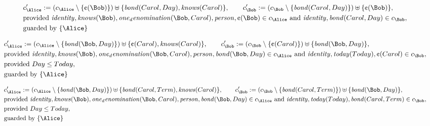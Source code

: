 \begin{align*}
&
c'_
{
\Alice
}
 := 
(c_
{
\Alice
}
 \setminus 
\{
\text{\textcent}
(
\Bob
)
\}
) \uplus 
\{
\mathit{
bond
}
(
Carol
,
Day
)
,
\mathit{
knows
}
(
Carol
)
\}
, \qquad 
c'_
{
\Bob
}
 := 
(c_
{
\Bob
}
 \setminus 
\{
\mathit{
bond
}
(
Carol
,
Day
)
\}
) \uplus 
\{
\text{\textcent}
(
\Bob
)
\}
,\\
&
\text{provided } 
\mathit{
identity
}
,
\mathit{
knows
}
(
\Bob
)
,
\mathit{
one_denomination
}
(
\Bob
,
Carol
)
,
\mathit{
person
}
,
\text{\textcent}
(
\Bob
)
 \in c_
{
\Alice
}
 \text{ and } 
\mathit{
identity
}
,
\mathit{
bond
}
(
Carol
,
Day
)
 \in c_
{
\Bob
}
,\\
&
\text{guarded by } \{
\Alice
\}
\end{align*}

\begin{align*}
&
c'_
{
\Alice
}
 := 
(c_
{
\Alice
}
 \setminus 
\{
\mathit{
bond
}
(
\Bob
,
Day
)
\}
) \uplus 
\{
\text{\textcent}
(
Carol
)
,
\mathit{
knows
}
(
Carol
)
\}
, \qquad 
c'_
{
\Bob
}
 := 
(c_
{
\Bob
}
 \setminus 
\{
\text{\textcent}
(
Carol
)
\}
) \uplus 
\{
\mathit{
bond
}
(
\Bob
,
Day
)
\}
,\\
&
\text{provided } 
\mathit{
identity
}
,
\mathit{
knows
}
(
\Bob
)
,
\mathit{
one_denomination
}
(
\Bob
,
Carol
)
,
\mathit{
person
}
,
\mathit{
bond
}
(
\Bob
,
Day
)
 \in c_
{
\Alice
}
 \text{ and } 
\mathit{
identity
}
,
\mathit{
today
}
(
Today
)
,
\text{\textcent}
(
Carol
)
 \in c_
{
\Bob
}
,\\
&
\text{provided } 
Day
\le
Today
,\\
&
\text{guarded by } \{
\Alice
\}
\end{align*}

\begin{align*}
&
c'_
{
\Alice
}
 := 
(c_
{
\Alice
}
 \setminus 
\{
\mathit{
bond
}
(
\Bob
,
Day
)
\}
) \uplus 
\{
\mathit{
bond
}
(
Carol
,
Term
)
,
\mathit{
knows
}
(
Carol
)
\}
, \qquad 
c'_
{
\Bob
}
 := 
(c_
{
\Bob
}
 \setminus 
\{
\mathit{
bond
}
(
Carol
,
Term
)
\}
) \uplus 
\{
\mathit{
bond
}
(
\Bob
,
Day
)
\}
,\\
&
\text{provided } 
\mathit{
identity
}
,
\mathit{
knows
}
(
\Bob
)
,
\mathit{
one_denomination
}
(
\Bob
,
Carol
)
,
\mathit{
person
}
,
\mathit{
bond
}
(
\Bob
,
Day
)
 \in c_
{
\Alice
}
 \text{ and } 
\mathit{
identity
}
,
\mathit{
today
}
(
Today
)
,
\mathit{
bond
}
(
Carol
,
Term
)
 \in c_
{
\Bob
}
,\\
&
\text{provided } 
Day
\le
Today
,\\
&
\text{guarded by } \{
\Alice
\}
\end{align*}
